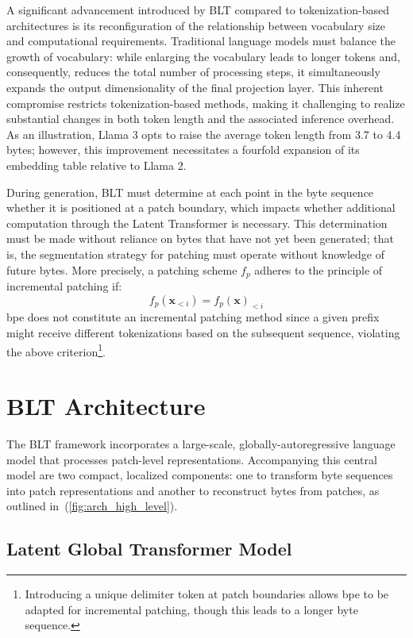 A significant advancement introduced by {\textsc BLT} compared to tokenization-based architectures is its reconfiguration of the relationship between vocabulary size and computational requirements. Traditional language models must balance the growth of vocabulary: while enlarging the vocabulary leads to longer tokens and, consequently, reduces the total number of processing steps, it simultaneously expands the output dimensionality of the final projection layer. This inherent compromise restricts tokenization-based methods, making it challenging to realize substantial changes in both token length and the associated inference overhead. As an illustration, Llama 3 opts to raise the average token length from 3.7 to 4.4 bytes; however, this improvement necessitates a fourfold expansion of its embedding table relative to Llama 2.

During generation, {\textsc BLT} must determine at each point in the byte sequence whether it is positioned at a patch boundary, which impacts whether additional computation through the Latent Transformer is necessary. This determination must be made without reliance on bytes that have not yet been generated; that is, the segmentation strategy for patching must operate without knowledge of future bytes. More precisely, a patching scheme $f_p$ adheres to the principle of incremental patching if:
$$f_p(\pmb{x}_{<i}) = f_p(\pmb{x})_{<i}$$
bpe does not constitute an incremental patching method since a given prefix might receive different tokenizations based on the subsequent sequence, violating the above criterion\footnote{Introducing a unique delimiter token at patch boundaries allows bpe to be adapted for incremental patching, though this leads to a longer byte sequence.}.

\section{{\textsc BLT} Architecture}
\label{section:architecture}
The {\textsc BLT} framework incorporates a large-scale, globally-autoregressive language model that processes patch-level representations. Accompanying this central model are two compact, localized components: one to transform byte sequences into patch representations and another to reconstruct bytes from patches, as outlined in~(\autoref{fig:arch_high_level}).

\subsection{Latent Global Transformer Model}

